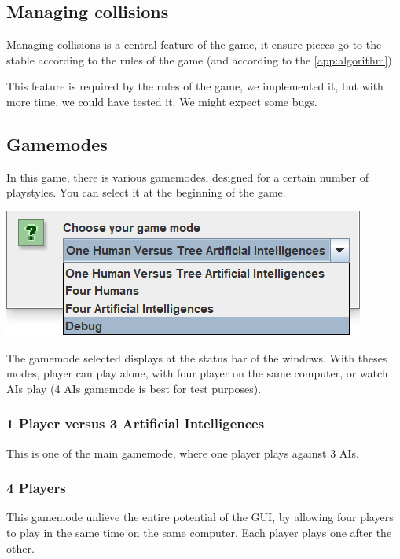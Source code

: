 \documentclass[english, 11pt, titlepage]{article}
\begin{document}
    \subsection{Managing collisions}
    Managing collisions is a central feature of the game, it ensure pieces go to the stable according to the rules of the game (and according to the \autoref{app:algorithm})
    
    This feature is required by the rules of the game, we implemented it, but with more time, we could have tested it. We might expect some bugs.

    \subsection{Gamemodes}
    \label{section:gamemodes}
    In this game, there is various gamemodes, designed for a certain number of playstyles. You can select it at the beginning of the game.

    \begin{center}
        \includegraphics{gamemodeSelection.png}
    \end{center}

    The gamemode selected displays at the status bar of the windows. With theses modes, player can play alone, with four player on the same computer, or watch AIs play (4 AIs gamemode is best for test purposes).

    \subsubsection{1 Player versus 3 Artificial Intelligences}
    This is one of the main gamemode, where one player plays against 3 AIs.

    \subsubsection{4 Players}
    This gamemode unlieve the entire potential of the GUI, by allowing four players to play in the same time on the same computer. Each player plays one after the other.
\end{document}
